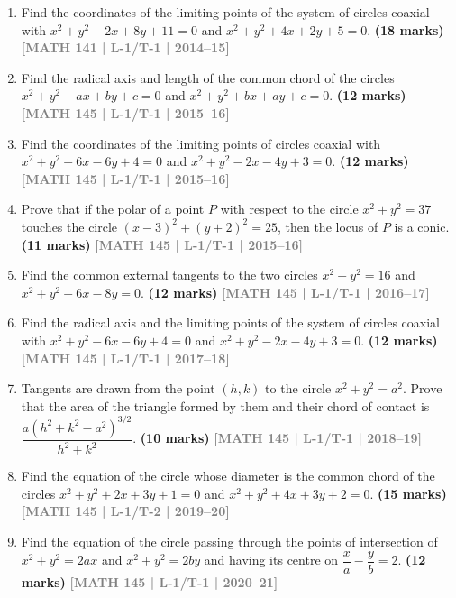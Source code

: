 \documentclass[12pt,a4paper]{article}
\newcommand{\yr}[1]{\hfill\textcolor{gray}{\small\textbf{[#1]}}}
\newcommand{\mk}[1]{\textcolor{orange!70!black}{\small\textbf{(#1 marks)}}}
\begin{document}
\begin{enumerate}
\item Find the coordinates of the limiting points of the system of circles coaxial with $x^{2}+y^{2}-2x+8y+11=0$ and $x^{2}+y^{2}+4x+2y+5=0$.
\mk{18} \yr{MATH 141 | L-1/T-1 | 2014--15}

\item Find the radical axis and length of the common chord of the circles $x^{2}+y^{2}+ax+by+c=0$ and $x^{2}+y^{2}+bx+ay+c=0$.
\mk{12} \yr{MATH 145 | L-1/T-1 | 2015--16}

\item Find the coordinates of the limiting points of circles coaxial with $x^{2}+y^{2}-6x-6y+4=0$ and $x^{2}+y^{2}-2x-4y+3=0$.
\mk{12} \yr{MATH 145 | L-1/T-1 | 2015--16}

\item Prove that if the polar of a point $P$ with respect to the circle $x^{2}+y^{2}=37$ touches the circle $(x-3)^{2}+(y+2)^{2}=25$, then the locus of $P$ is a conic.
\mk{11} \yr{MATH 145 | L-1/T-1 | 2015--16}

\item Find the common external tangents to the two circles $x^{2}+y^{2}=16$ and $x^{2}+y^{2}+6x-8y=0$.
\mk{12} \yr{MATH 145 | L-1/T-1 | 2016--17}

\item Find the radical axis and the limiting points of the system of circles coaxial with $x^{2}+y^{2}-6x-6y+4=0$ and $x^{2}+y^{2}-2x-4y+3=0$.
\mk{12} \yr{MATH 145 | L-1/T-1 | 2017--18}

\item Tangents are drawn from the point $(h,k)$ to the circle $x^{2}+y^{2}=a^{2}$. Prove that the area of the triangle formed by them and their chord of contact is $\dfrac{a(h^{2}+k^{2}-a^{2})^{3/2}}{h^{2}+k^{2}}$.
\mk{10} \yr{MATH 145 | L-1/T-1 | 2018--19}

\item Find the equation of the circle whose diameter is the common chord of the circles $x^{2}+y^{2}+2x+3y+1=0$ and $x^{2}+y^{2}+4x+3y+2=0$.
\mk{15} \yr{MATH 145 | L-1/T-2 | 2019--20}

\item Find the equation of the circle passing through the points of intersection of $x^{2}+y^{2}=2ax$ and $x^{2}+y^{2}=2by$ and having its centre on $\dfrac{x}{a}-\dfrac{y}{b}=2$.
\mk{12} \yr{MATH 145 | L-1/T-1 | 2020--21}



\end{enumerate}
\end{document}
